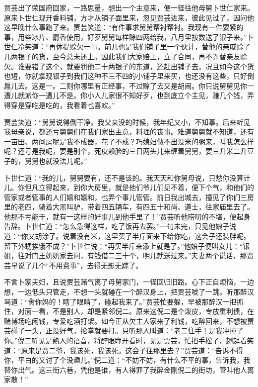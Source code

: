 \documentclass[12pt,oneside]{book}
\begin{document}
贾芸出了荣国府回家，一路思量，想出一个主意来，便一径往他母舅卜世仁家来。原来卜世仁现开香料铺，方才从铺子面里来，忽见贾芸进来，彼此见过了，因问他这早晚什么事跑了来。贾芸笑道：“有件事求舅舅帮衬帮衬。我现有一件要紧的事，用些冰片、麝香使用，好歹舅舅每样赊四两给我，八月里按数送了银子来。”卜世仁冷笑道：“再休提赊欠一事。前儿也是我们铺子里一个伙计，替他的亲戚赊了几两银子的货，至今总未还上。因此我们大家赔上，立了合同，再不许替亲友赊欠。谁要错了这个，就要罚他二十两银子的东道，还赶出铺子去。况且如今这个货也短，你就拿现银子到我们这种不三不四的小铺子里来买，也还没有这些，只好倒扁儿去。这是一。二则你哪里有正经事，不过赊了去又是胡闹。你只说舅舅见你一遭儿就派你一遭儿不是。你小人儿家很不知好歹，也到底立个主见，赚几个钱，弄得穿是穿吃是吃的，我看着也喜欢。”

贾芸笑道：“舅舅说得倒干净。我父亲没的时候，我年纪又小，不知事。后来听见我母亲说，都还亏舅舅们在我们家出主意，料理的丧事。难道舅舅就不知道，还有一亩田、两间房呢是我不成器，花了不成？巧媳妇做不出没米的粥来，叫我怎么样呢？还亏是我呢，要是别个，死皮赖脸的三日两头儿来缠着舅舅，要三升米二升豆子的，舅舅也就没法儿呢。”

卜世仁道：“我的儿，舅舅要有，还不是该的。我天天和你舅母说，只愁你没算计儿。你但凡立得起来，到你大房里，就是他们爷儿们见不着，便下个气，和他们的管家或者管事的人们嬉和嬉和，也弄个事儿管管。前日我出城去，撞见了你们三房里的老四，骑着大黑叫驴，带着四五辆车，有四五十和尚、道士，往家庙里去了。他那不亏能干，就有一这样的好事儿到他手里了！”贾芸听他唠叨的不堪，便起身告辞。卜世仁道：“怎么急得这样，吃了饭再去罢。”一句未完，只见他娘子说道：“你又胡涂了。说着没有米，这里买了半斤面来下给你吃，这会子还装胖呢。留下外甥挨饿不成？”卜世仁说：“再买半斤来添上就是了。”他娘子便叫女儿：“银姐，往对门王奶奶家去问，有钱借二三十个，明儿就送过来。”夫妻两个说话，那贾芸早说了几个“不用费事”，去得无影无踪了。

不言卜家夫妇，且说贾芸赌气离了母舅家门，一径回归旧路。心下正自烦恼，一边想，一边低头只管走，不想一头就碰在一个醉汉身上，把贾芸唬了一跳。听那醉汉骂道：“肏你妈的！瞎了眼睛了，碰起我来了。”贾芸忙要躲，早被那醉汉一把抓住，对面一看，不是别人，却是紧邻倪二。原来这倪二是个泼皮，专放重利债，在赌博场吃闲钱，专爱吃酒打架。如今正从欠主人家来了利钱，吃醉回来，不想被贾芸碰了一头，正没好气，抡拳就要打。只听那人叫道：“老二住手！是我冲撞了你。”倪二听见是熟人的语音，将醉眼睁开看时，见是贾芸，忙把手松了，趔趄着笑道：“原来是贾二爷，我该死，我该死。这会子往那里去？”贾芸道：“告诉不得你，平白的又讨了个没趣儿。”倪二道：“不妨不妨，有什么不平的事，告诉我，我替你出气。这三街六巷，凭他是谁，有人得罪了我醉金刚倪二的街坊，管叫他人离家散！”
\end{document}
